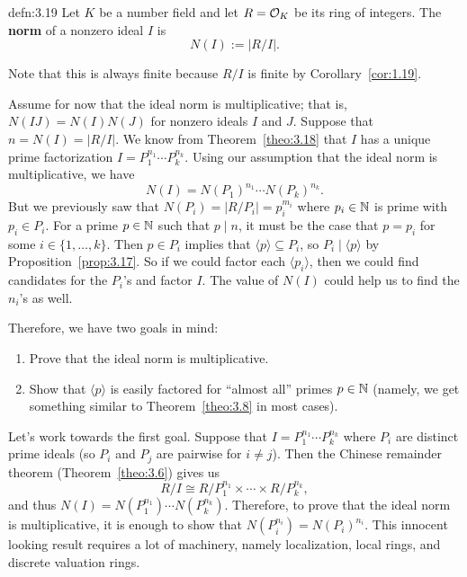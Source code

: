 \begin{defn}{defn:3.19}
    Let $K$ be a number field and let $R = {\cal O}_K$ be its ring of integers. 
    The {\bf norm} of a nonzero ideal $I$ is 
    \[ N(I) := |R/I|. \] 
\end{defn}\vspace{-0.25cm}
Note that this is always finite because $R/I$ is finite by Corollary~\ref{cor:1.19}.

Assume for now that the ideal norm is multiplicative; that is, 
$N(IJ) = N(I)N(J)$ for nonzero ideals $I$ and $J$. Suppose that 
$n = N(I) = |R/I|$. We know from Theorem~\ref{theo:3.18} that $I$ has a 
unique prime factorization $I = P_1^{n_1} \cdots P_k^{n_k}$. Using our
assumption that the ideal norm is multiplicative, we have 
\[ N(I) = N(P_1)^{n_1} \cdots N(P_k)^{n_k}. \] 
But we previously saw that $N(P_i) = |R/P_i| = p_i^{m_i}$ where 
$p_i \in \mathbb{N}$ is prime with $p_i \in P_i$. For a prime $p \in \mathbb{N}$ 
such that $p \mid n$, it must be the case that $p = p_i$ for some $i \in 
\{1, \dots, k\}$. Then $p \in P_i$ implies that $\langle p \rangle 
\subseteq P_i$, so $P_i \mid \langle p \rangle$ by Proposition~\ref{prop:3.17}.
So if we could factor each $\langle p_i \rangle$, then we could find 
candidates for the $P_i$'s and factor $I$. The value of $N(I)$ could 
help us to find the $n_i$'s as well. 

Therefore, we have two goals in mind: 
\begin{enumerate}[(1)]
    \item Prove that the ideal norm is multiplicative.
    \item Show that $\langle p \rangle$ is easily factored for ``almost all''
    primes $p \in \mathbb{N}$ (namely, we get something similar to 
    Theorem~\ref{theo:3.8} in most cases).
\end{enumerate}
Let's work towards the first goal. Suppose that $I = P_1^{n_1} \cdots P_k^{n_k}$
where $P_i$ are distinct prime ideals (so $P_i$ and $P_j$ are pairwise 
for $i \neq j$). Then the Chinese remainder theorem (Theorem~\ref{theo:3.6})
gives us 
\[ R/I \cong R/P_1^{n_1} \times \cdots \times R/P_k^{n_k}, \] 
and thus $N(I) = N(P_1^{n_1}) \cdots N(P_k^{n_k})$. Therefore, to 
prove that the ideal norm is multiplicative, it is enough to show that 
$N(P_i^{n_i}) = N(P_i)^{n_i}$. This innocent looking result requires a 
lot of machinery, namely localization, local rings, and discrete valuation rings.
